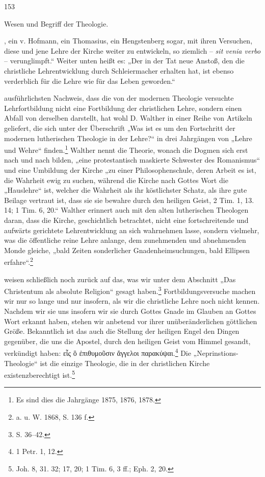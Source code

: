 \hfill 153\n\n\centerline{Wesen und Begriff der Theologie.}\n\par\nNeuzeit, ein v. Hofmann, ein Thomasius, ein Hengstenberg sogar, mit ihren Versuchen, diese und jene Lehre der Kirche weiter zu entwickeln, so ziemlich -- \emph{sit venia verbo} -- verunglimpft.“ Weiter unten heißt es: „Der in der Tat neue Anstoß, den die christliche Lehrentwicklung durch Schleiermacher erhalten hat, ist ebenso verderblich für die Lehre wie für das Leben geworden.“\n\par\nDen ausführlichsten Nachweis, dass die von der modernen Theologie versuchte Lehrfortbildung nicht eine Fortbildung der christlichen Lehre, sondern einen Abfall von derselben darstellt, hat wohl D. Walther in einer Reihe von Artikeln geliefert, die sich unter der Überschrift „Was ist es um den Fortschritt der modernen lutherischen Theologie in der Lehre?“ in drei Jahrgängen von „Lehre und Wehre“ finden.\footnote{Es sind dies die Jahrgänge 1875, 1876, 1878.} Walther nennt die Theorie, wonach die Dogmen sich erst nach und nach bilden, „eine protestantisch maskierte Schwester des Romanismus“ und eine Umbildung der Kirche „zu einer Philosophenschule, deren Arbeit es ist, die Wahrheit ewig zu suchen, während die Kirche nach Gottes Wort die „Hauslehre“ ist, welcher die Wahrheit als ihr köstlichster Schatz, als ihre gute Beilage vertraut ist, dass sie sie bewahre durch den heiligen Geist, 2 Tim. 1, 13. 14; 1 Tim. 6, 20.“ Walther erinnert auch mit den alten lutherischen Theologen daran, dass die Kirche, geschichtlich betrachtet, nicht eine fortschreitende und aufwärts gerichtete Lehrentwicklung an sich wahrnehmen lasse, sondern vielmehr, was die öffentliche reine Lehre anlange, dem zunehmenden und abnehmenden Monde gleiche, „bald Zeiten sonderlicher Gnadenheimsuchungen, bald Ellipsen erfahre“.\footnote{a. u. W. 1868, S. 136 f.}\n\par\nWir weisen schließlich noch zurück auf das, was wir unter dem Abschnitt „Das Christentum als absolute Religion“ gesagt haben.\footnote{S. 36--42.} Fortbildungsversuche machen wir nur so lange und nur insofern, als wir die christliche Lehre noch nicht kennen. Nachdem wir sie uns insofern wir sie durch Gottes Gnade im Glauben an Gottes Wort erkannt haben, stehen wir anbetend vor ihrer unüberänderlichen göttlichen Größe. Bekanntlich ist das auch die Stellung der heiligen Engel den Dingen gegenüber, die uns die Apostel, durch den heiligen Geist vom Himmel gesandt, verkündigt haben: \foreignlanguage{greek}{εἷς ὃ ἐπιθυμοῦσιν ἄγγελοι παρακύψαι}.\footnote{1 Petr. 1, 12.} Die „Neprinstions-Theologie“ ist die einzige Theologie, die in der christlichen Kirche existenzberechtigt ist.\footnote{Joh. 8, 31. 32; 17, 20; 1 Tim. 6, 3 ff.; Eph. 2, 20.}